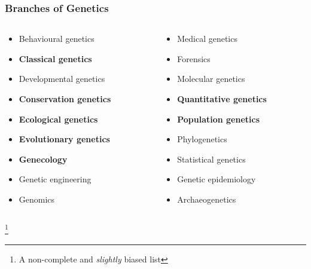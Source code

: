 \documentclass{beamer}
\newcommand\blfootnote[1]{%
	\begingroup
	\renewcommand\thefootnote{}\footnote{#1}%
	\addtocounter{footnote}{-1}%
	\endgroup
}
\begin{document}
\begin{frame}
	
	\frametitle{Branches of Genetics}
	
	\begin{columns}[T]
		
		\begin{column}{0.45\textwidth}
			\begin{itemize}
			\item{Behavioural genetics}
			\item{\textbf{Classical genetics}}
			\item{Developmental genetics}
			\item{\textbf{Conservation genetics}}
			\item{\textbf{Ecological genetics}}
			\item{\textbf{Evolutionary genetics}}
			\item{\textbf{Genecology}}
			\item{Genetic engineering}
			\item{Genomics}
			
			\end{itemize}
			
		\end{column}
		\begin{column}{.45\textwidth}
			\begin{itemize}
			\item{Medical genetics}
				\item{Forensics}
				\item{Molecular genetics}
				\item{\textbf{Quantitative genetics}}
				\item{\textbf{Population genetics}}
				\item{Phylogenetics}
				\item{Statistical genetics}
				\item{Genetic epidemiology}
				\item{Archaeogenetics}
			\end{itemize}
		\end{column}
		\end{columns}
		\blfootnote{A non-complete and \textit{slightly} biased list}
\end{frame}

\end{document}
